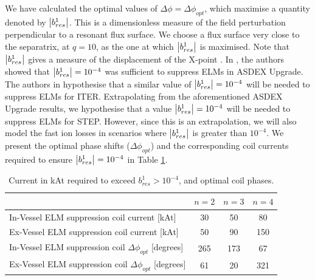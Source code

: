 \documentclass[10pt, a4paper, twoside]{article}
\begin{document}
We have calculated the optimal values of $\Delta \phi = \Delta \phi_{opt}$, which maximise a quantity denoted by $\abs{b^1_{res}}$. This is a dimensionless measure of the field perturbation perpendicular to a resonant flux surface. We choose a flux surface very close to the separatrix, at $q=10$, as the one at which $\abs{b^1_{res}}$ is maximised. 
Note that $\abs{b^1_{res}}$ gives a measure of the displacement of the X-point \cite{ryan2017}. In \cite{suttrop2018}, the authors showed that $\abs{b^1_{res}}=10^{-4}$ was sufficient to suppress ELMs in ASDEX Upgrade. The authors in \cite{liu2015} hypothesise that a similar value of $\abs{b^1_{res}}=10^{-4}$ will be needed to suppress ELMs for ITER. Extrapolating from the aforementioned ASDEX Upgrade results, we hypothesise that a value $\abs{b^1_{res}}=10^{-4}$ will be needed to suppress ELMs for STEP. However, since this is an extrapolation, we will also model the fast ion losses in scenarios where $\abs{b^1_{res}}$ is greater than $10^{-4}$. We present the optimal phase shifts ($\Delta \phi_{opt}$) and the corresponding coil currents required to ensure $\abs{b^1_{res}}=10^{-4}$ in Table \ref{table:optimum_currents_and_phases}. 
\begin{table}[htbp]
\centering
\begin{tabular}{lccc}
\hline
 & \( n=2 \) & \( n=3 \) & \( n=4 \) \\
\hline
In-Vessel ELM suppression coil current [kAt] & 30 & 50 & 80 \\
Ex-Vessel ELM suppression coil current [kAt] & 50 & 90 & 150 \\
In-Vessel ELM suppression coil \(\Delta\phi_{opt}\) [degrees] & 265 & 173 & 67 \\
Ex-Vessel ELM suppression coil \(\Delta\phi_{opt}\) [degrees] & 61 & 20 & 321 \\
\hline
\end{tabular}
\caption{Current in kAt required to exceed \( b^1_{res} > 10^{-4} \), and optimal coil phases.}
\label{table:optimum_currents_and_phases}
\end{table}
\end{document}
